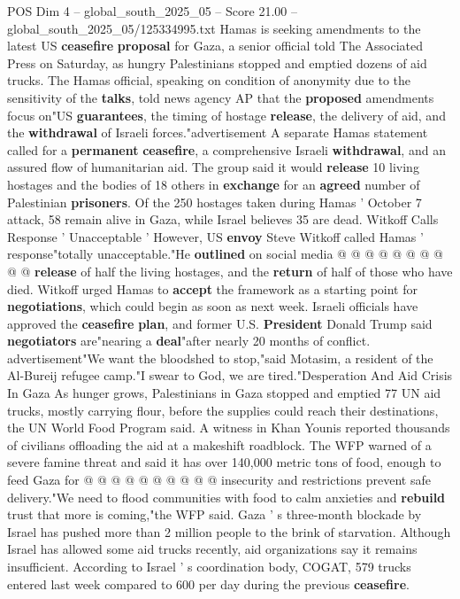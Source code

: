 \begin{textsample}{POS Dim 4 – global\_south\_2025\_05 – Score 21.00 – global\_south\_2025\_05/125334995.txt}  \label{ex:f4_pos_097}
Hamas is seeking amendments to the latest US \textbf{ceasefire} \textbf{proposal} for Gaza, a senior official told The Associated Press on Saturday, as hungry Palestinians stopped and emptied dozens of aid trucks.
The Hamas official, speaking on condition of anonymity due to the sensitivity of the \textbf{talks}, told news agency AP that the \textbf{proposed} amendments focus on"US \textbf{guarantees}, the timing of hostage \textbf{release}, the delivery of aid, and the \textbf{withdrawal} of Israeli forces."advertisement A separate Hamas statement called for a \textbf{permanent} \textbf{ceasefire}, a comprehensive Israeli \textbf{withdrawal}, and an assured flow of humanitarian aid.
The group said it would \textbf{release} 10 living hostages and the bodies of 18 others in \textbf{exchange} for an \textbf{agreed} number of Palestinian \textbf{prisoners}.
Of the 250 hostages taken during Hamas ' October 7 attack, 58 remain alive in Gaza, while Israel believes 35 are dead.
Witkoff Calls Response ' Unacceptable ' However, US \textbf{envoy} Steve Witkoff called Hamas ' response"totally unacceptable."He \textbf{outlined} on social media @ @ @ @ @ @ @ @ @ @ \textbf{release} of half the living hostages, and the \textbf{return} of half of those who have died.
Witkoff urged Hamas to \textbf{accept} the framework as a starting point for \textbf{negotiations}, which could begin as soon as next week.
Israeli officials have approved the \textbf{ceasefire} \textbf{plan}, and former U.S. \textbf{President} Donald Trump said \textbf{negotiators} are"nearing a \textbf{deal}"after nearly 20 months of conflict. advertisement"We want the bloodshed to stop,"said Motasim, a resident of the Al-Bureij refugee camp."I swear to God, we are tired."Desperation And Aid Crisis In Gaza As hunger grows, Palestinians in Gaza stopped and emptied 77 UN aid trucks, mostly carrying flour, before the supplies could reach their destinations, the UN World Food Program said.
A witness in Khan Younis reported thousands of civilians offloading the aid at a makeshift roadblock.
The WFP warned of a severe famine threat and said it has over 140,000 metric tons of food, enough to feed Gaza for @ @ @ @ @ @ @ @ @ @ insecurity and restrictions prevent safe delivery."We need to flood communities with food to calm anxieties and \textbf{rebuild} trust that more is coming,"the WFP said.
Gaza ' s three-month blockade by Israel has pushed more than 2 million people to the brink of starvation.
Although Israel has allowed some aid trucks recently, aid organizations say it remains insufficient.
According to Israel ' s coordination body, COGAT, 579 trucks entered last week compared to 600 per day during the previous \textbf{ceasefire}.

\end{textsample}
